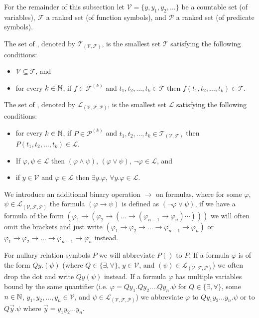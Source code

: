 For the remainder of this subsection let $\mathcal{V}=\{y,y_1,y_2,\dots\}$ be a countable set (of variables), $\mathcal{F}$ a ranked set (of function symbols), and $\mathcal{P}$ a ranked set (of predicate symbols).
\begin{definition}
	The set of , denoted by $\mathcal{T}_{(\mathcal{V},\mathcal{F})}$, is the smallest set $\mathcal{T}$ satisfying the following conditions:
	\begin{itemize}
		\item $\mathcal{V} \subseteq \mathcal{T}$, and
		\item for every $k\in\mathbb{N}$, if $f\in\mathcal{F}^{(k)}$ and $t_1,t_2,\dots,t_k\in\mathcal{T}$ then $f(t_1,t_2,\dots,t_k)\in\mathcal{T}$.
	\end{itemize}
	The set of , denoted by $\mathcal{L}_{(\mathcal{V},\mathcal{F},\mathcal{P})}$, is the smallest set $\mathcal{L}$ satisfying the following conditions:
	\begin{itemize}
		\item for every $k\in\mathbb{N}$, if $P\in\mathcal{P}^{(k)}$ and $t_1,t_2,\dots,t_k\in\mathcal{T}_{(\mathcal{V},\mathcal{F})}$ then $P(t_1,t_2,\dots,t_k)\in\mathcal{L}$.
		\item If $\varphi,\psi\in\mathcal{L}$ then $(\varphi\wedge\psi)$, $(\varphi\vee\psi)$, $\neg \varphi\in\mathcal{L}$, and
		\item if $y\in\mathcal{V}$ and $\varphi\in\mathcal{L}$ then $\exists y.\varphi$, $\forall y.\varphi\in\mathcal{L}$.
	\end{itemize}
\end{definition}
We introduce an additional binary operation $\to$ on formulas, where for some $\varphi$, $\psi\in\mathcal{L}_{(\mathcal{V},\mathcal{F},\mathcal{P})}$ the formula $(\varphi\to\psi)$ is defined as $(\neg\varphi\vee\psi)$, if we have a formula of the form $(\varphi_1\to(\varphi_2\to(\dots \to(\varphi_{n-1}\to \varphi_n)\cdots)))$ we will often omit the brackets and just write $(\varphi_1\to \varphi_2\to\dots\to \varphi_{n-1}\to \varphi_n)$ or $\varphi_1\to \varphi_2\to\dots \to \varphi_{n-1}\to \varphi_n$ instead. 

For nullary relation symbols $P$ we will abbreviate $P()$ to $P$. If a formula $\varphi$ is of the form $Qy.(\psi)$ (where $Q\in\{\exists,\forall\}$, $y\in\mathcal{V}$, and $(\psi)\in\mathcal{L}_{(\mathcal{V},\mathcal{F},\mathcal{P})}$) we often drop the dot and write $Qy(\psi)$ instead. %
If a formula $\varphi$ has multiple variables bound by the same quantifier (i.e. $\varphi=Qy_1.Qy_2.\dots Qy_n.\psi$ for $Q\in\{\exists,\forall\}$, some $n\in\mathbb{N}$, $y_1,y_2,\dots,y_n\in\mathcal{V}$, and $\psi\in\mathcal{L}_{(\mathcal{V},\mathcal{F},\mathcal{P})}$) we abbreviate $\varphi$ to $Qy_1y_2\dots y_n.\psi$ or to $Q\vec{y}.\psi$ where $\vec{y}=y_1y_2\dots y_n$.

